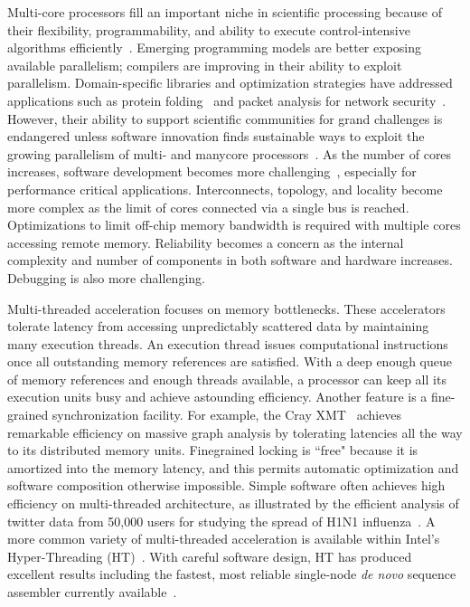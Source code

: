 Multi-core processors fill an important niche in scientific processing because of their flexibility,
programmability, and ability to execute control-intensive algorithms efficiently~\cite{Kang2009,Williams2009,aparna.fmm}.
Emerging programming models are better exposing available parallelism; compilers are improving
in their ability to exploit parallelism. Domain-specific libraries and optimization strategies have
addressed applications such as protein folding~\cite{5160922} and packet analysis for network security~\cite{fusco:2010:imc}.
However, their ability to support scientific communities for grand challenges is endangered unless
software innovation finds sustainable ways to exploit the growing parallelism of multi- and manycore
processors~\cite{patternson:2010:spectrum}. As the number of cores increases, software development becomes more
challenging~\cite{conf/sc/MattsonRLBHKHVBRD10,Asanovic:2009:VPC:1562764.1562783}, especially for performance critical applications. Interconnects, topology,
and locality become more complex as the limit of cores connected via a single bus is reached.
Optimizations to limit off-chip memory bandwidth is required with multiple cores accessing remote memory. 
Reliability becomes a concern as the internal complexity and number of components in
both software and hardware increases. Debugging is also more challenging.

Multi-threaded acceleration focuses on memory bottlenecks. These accelerators tolerate latency
from accessing unpredictably scattered data by maintaining many execution threads. An execution
thread issues computational instructions once all outstanding memory references are satisfied. With
a deep enough queue of memory references and enough threads available, a processor can keep
all its execution units busy and achieve astounding efficiency. Another feature is a fine-grained
synchronization facility. 
For example, the Cray XMT~\cite{CrayInc.2007} achieves remarkable efficiency on
massive graph analysis by tolerating latencies all the way to its distributed memory units. Finegrained
locking is ``free" because it is amortized into the memory latency, and this permits automatic
optimization and software composition otherwise impossible. 
Simple software often achieves high
efficiency on multi-threaded architecture, as illustrated by the efficient analysis of twitter data
from 50,000 users for studying the spread of H1N1 influenza~\cite{Ediger2010a}. 
A more common variety of
multi-threaded acceleration is available within Intel’s Hyper-Threading (HT)~\cite{IntelCorp.2002,Riedy2011b,pasqual}. 
With
careful software design, HT has produced excellent results including the fastest, most reliable
single-node \textit{de novo} sequence assembler currently available~\cite{pasqual}.

